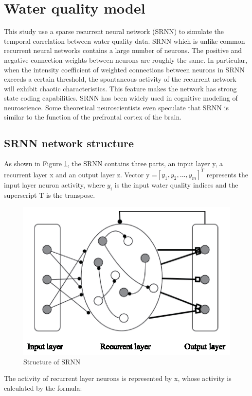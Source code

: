 \documentclass[runningheads]{llncs}
\begin{document}
\section{Water quality model}
This study use a sparse recurrent neural network (SRNN)
to simulate the temporal correlation between water quality data. 
SRNN which is unlike common recurrent neural networks contains a 
large number of neurons. The positive and negative connection 
weights between neurons are roughly the same. In particular, 
when the intensity coefficient of weighted connections between 
neurons in SRNN exceeds a certain threshold, the spontaneous activity 
of the recurrent network will exhibit chaotic characteristics\cite{RN17}. 
This feature makes the network has strong state coding capabilities. 
SRNN has been widely used in cognitive modeling of neuroscience. 
Some theoretical neuroscientists even speculate that SRNN is similar 
to the function of the prefrontal cortex of the brain\cite{RN18}.
\subsection{SRNN network structure}
As shown in Figure \ref{Structure of SRNN}, 
the SRNN contains three parts, an input layer y, a recurrent layer x and an output layer z.
Vector y =$\left[y_1,y_2,...,y_m\right]^T$ represents the input layer neuron activity,
 where $y_i$ is the input water quality indices and the superscript T is the transpose.

\begin{figure}[htbp]
\centering
\includegraphics[width=0.7\columnwidth]{Structure_of_SRNN}
\caption{Structure of SRNN}
\label{Structure of SRNN}
\end{figure}

The activity of recurrent layer neurons is represented by x, 
whose activity is calculated by the formula:
\end{document}
